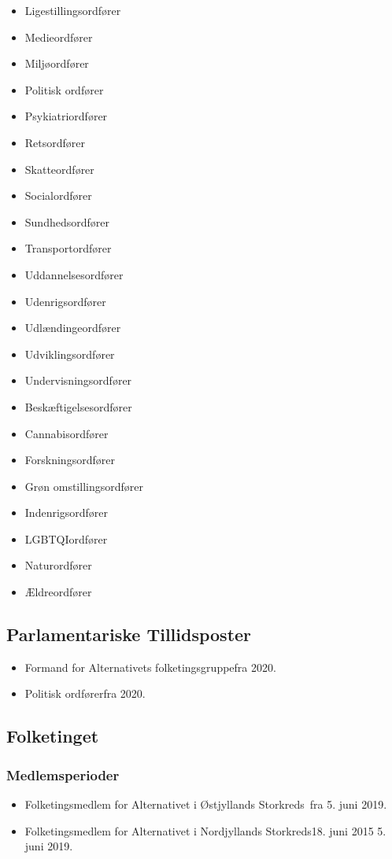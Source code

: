 \documentclass[11pt, a4paper]{awesome-cv}
\begin{document}
\begin{cvletter}
\begin{itemize}
\item Ligestillingsordfører
\item Medieordfører
\item Miljøordfører
\item Politisk ordfører
\item Psykiatriordfører
\item Retsordfører
\item Skatteordfører
\item Socialordfører
\item Sundhedsordfører
\item Transportordfører
\item Uddannelsesordfører
\item Udenrigsordfører
\item Udlændingeordfører
\item Udviklingsordfører
\item Undervisningsordfører
\item Beskæftigelsesordfører
\item Cannabisordfører
\item Forskningsordfører
\item Grøn omstillingsordfører
\item Indenrigsordfører
\item LGBTQIordfører
\item Naturordfører
\item Ældreordfører
\end{itemize}
\subsection*{Parlamentariske Tillidsposter}
\begin{itemize}
\item Formand for Alternativets folketingsgruppefra 2020.
\item Politisk ordførerfra 2020.
\end{itemize}
\subsection*{Folketinget}
\subsubsection*{Medlemsperioder}
\begin{itemize}
\item Folketingsmedlem for Alternativet i Østjyllands Storkreds fra 5. juni 2019.
\item Folketingsmedlem for Alternativet i Nordjyllands Storkreds18. juni 2015  5. juni 2019.
\end{itemize}

\end{cvletter}
\end{document}
